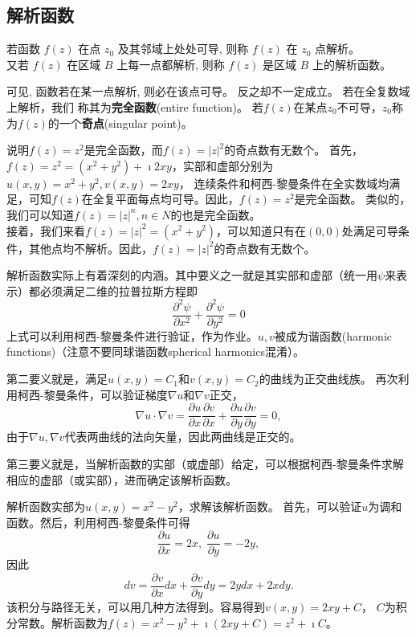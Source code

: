 \subsection{解析函数}
\begin{Definition}
若函数 $f(z)$ 在点 $z_0$ 及其邻域上处处可导, 则称 $f(z)$ 在 $z_0$ 点解析。\\
 又若 $f(z)$ 在区域 $B$ 上每一点都解析, 则称 $f(z)$ 是区域 $B$ 上的解析函数。
\end{Definition} 
 可见, 函数若在某一点解析, 则必在该点可导。 反之却不一定成立。 若在全复数域上解析，我们
 称其为{\bf 完全函数}(entire function)。
 若$f(z)$在某点$z_0$不可导，$z_0$称为$f(z)$的一个{\bf 奇点}(singular point)。

 \begin{examplebox}{说明$f(z)=z^2$是完全函数，而$f(z)=|z|^2$的奇点数有无数个。}
    首先，$f(z) =z^2 = (x^2 + y ^2) + \imath 2 x y$，实部和虚部分别为$u(x,y) = x^2+ y^2, v(x,y)=2x y$，
连续条件和柯西-黎曼条件在全实数域均满足，可知$f(z)$在全复平面每点均可导。因此，$f(z)=z^2$是完全函数。
类似的，我们可以知道$f(z)=|z|^n, n\in N$的也是完全函数。\\
    接着，我们来看$f(z) = |z|^2 = (x^2 + y ^2)$，可以知道只有在$(0,0)$处满足可导条件，其他点均不解析。因此，$f(z)=|z|^2$的奇点数有无数个。
 \end{examplebox}

 解析函数实际上有着深刻的内涵。其中要义之一就是其实部和虚部（统一用$\psi$来表示）都必须满足二维的拉普拉斯方程即
 \begin{equation}
    \label{eq:Laplace_eq}
    \frac{\partial^2 \psi}{\partial x^2}+\frac{\partial^2 \psi}{\partial y^2}=0
 \end{equation}
上式可以利用柯西-黎曼条件进行验证，作为作业。$u,v$被成为谐函数(harmonic functions)（注意不要同球谐函数spherical harmonics混淆）。

第二要义就是，满足$u(x,y) = C_1$和$v(x,y)= C_2$的曲线为正交曲线族。
再次利用柯西-黎曼条件，可以验证梯度$\nabla u $和$\nabla v$正交，
\begin{equation}
    \nabla u \cdot \nabla v = \frac{\partial u}{\partial x} 
    \frac{\partial v}{\partial x}+\frac{\partial u}{\partial y} \frac{\partial v}{\partial y}=0 ,
\end{equation}
由于$\nabla u, \nabla v$代表两曲线的法向矢量，因此两曲线是正交的。

第三要义就是，当解析函数的实部（或虚部）给定，可以根据柯西-黎曼条件求解相应的虚部（或实部），进而确定该解析函数。

\begin{examplebox}{解析函数实部为$u(x,y) = x^2 - y^2$，求解该解析函数。}
首先，可以验证$u$为调和函数。然后，利用柯西-黎曼条件可得
\begin{equation}
    \frac{\partial u}{\partial x } = 2x, \; \frac{\partial u}{\partial y } = -2y  ,
\end{equation}
因此
\begin{equation}
    d v = \frac{\partial v}{\partial x } dx + \frac{\partial v}{\partial y } dy = 2y dx + 2x dy .
\end{equation}
该积分与路径无关，可以用几种方法得到。容易得到$v(x,y) = 2xy + C$， $C$为积分常数。解析函数为$f(z)=x^2 - y^2 + \imath (2x y + C) = z^2 + \imath C$。
\end{examplebox}
    